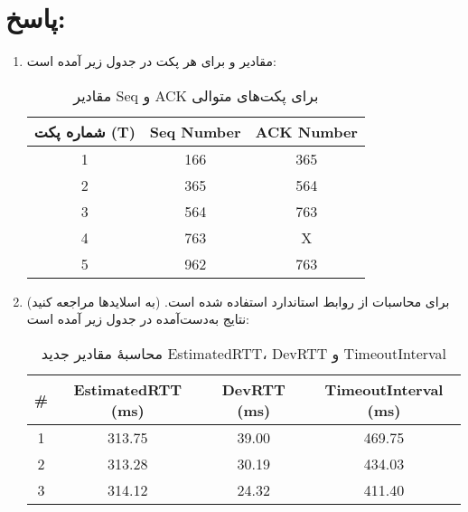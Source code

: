 \section*{پاسخ:}

\begin{enumerate}[label=\alph*)]

\item 
مقادیر  و  برای هر پکت در جدول زیر آمده است:

\begin{table}[H]
\centering
\begin{tabular}{|c|c|c|}
\hline
\textbf{شماره پکت (T)} & \textbf{Seq Number} & \textbf{ACK Number} \\ \hline
1 & 166 & 365 \\ \hline
2 & 365 & 564 \\ \hline
3 & 564 & 763 \\ \hline
4 & 763 & X \\ \hline
5 & 962 & 763 \\ \hline
\end{tabular}
\caption{مقادیر Seq و ACK برای پکت‌های متوالی}
\end{table}

\item 
برای محاسبات از روابط استاندارد  استفاده شده است. (به اسلاید‌ها مراجعه کنید)
نتایج به‌دست‌آمده در جدول زیر آمده است:
\begin{table}[H]
    \centering
    \begin{latin}
    \begin{tabular}{|c|c|c|c|}
    \hline
    \textbf{\#} & \textbf{EstimatedRTT (ms)} & \textbf{DevRTT (ms)} & \textbf{TimeoutInterval (ms)} \\ \hline
    1 & 313.75 & 39.00 & 469.75 \\ \hline
    2 & 313.28 & 30.19 & 434.03 \\ \hline
    3 & 314.12 & 24.32 & 411.40 \\ \hline
    \end{tabular}
    \end{latin}
    \caption{محاسبهٔ مقادیر جدید EstimatedRTT، DevRTT و TimeoutInterval}
    \end{table}
\end{enumerate}